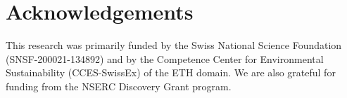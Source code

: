 \section{Acknowledgements}
%
This research was primarily funded by the Swiss National Science Foundation (SNSF-200021-134892) and by the Competence Center for Environmental Sustainability (CCES-SwissEx) of the ETH domain. We are also grateful for funding from the NSERC Discovery Grant program.





